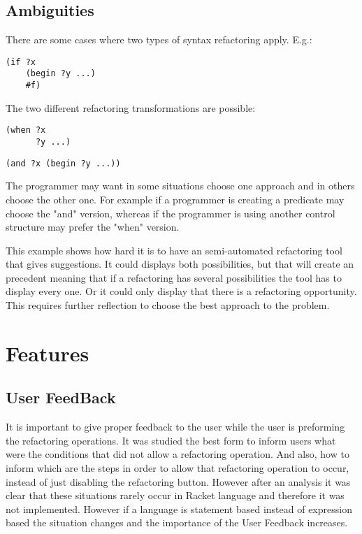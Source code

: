 
\subsection{Ambiguities}
There are some cases where two types of syntax refactoring apply.
E.g.:
\begin{lstlisting}[basicstyle=\ttfamily, caption="Code sample"]
(if ?x
    (begin ?y ...)
    #f)
\end{lstlisting}
The two different refactoring transformations are possible:
\begin{lstlisting}[basicstyle=\ttfamily, caption="Refactoring option 1"]
(when ?x
      ?y ...)
\end{lstlisting}

\begin{lstlisting}[basicstyle=\ttfamily, caption="Refactoring option 2"]
(and ?x (begin ?y ...))
\end{lstlisting}

The programmer may want in some situations choose one approach and in others
choose the other one. For example if a programmer is creating a predicate may
choose the "and" version, whereas if the programmer is using another control structure
may prefer the "when" version.

This example shows how hard it is to have an semi-automated refactoring tool
that gives suggestions.
It could displays both possibilities, but that will create an precedent meaning
that if a refactoring has several possibilities the tool has to display every one.
Or it could only display that there is a refactoring opportunity.
This requires further reflection to choose the best approach to the problem.



\section{Features}

\subsection{User FeedBack}
It is important to give proper feedback to the user while the user is preforming
the refactoring operations.
It was studied the best form to inform users what were the conditions that did not allow %
a refactoring operation.
And also, how to inform which are the steps in order to allow that refactoring operation to occur,
instead of just disabling the refactoring button.
However after an analysis it was clear that these situations rarely occur
in Racket language and therefore it was not implemented.
However if a language is statement based instead of expression based the situation changes
and the importance of the User Feedback increases. %

